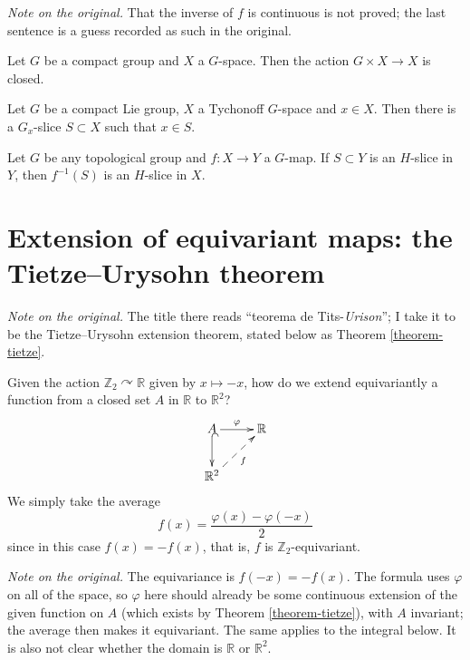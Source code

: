 \noindent
{\it Note on the original.} That the
inverse of $f$ is continuous is not
proved; the last sentence is a guess
recorded as such in the original.

\begin{lemma}
\label{lemma-compact-action-closed}
Let $G$ be a compact group and $X$ a
$G$-space. Then the action
$G\times X\to X$ is closed.
\end{lemma}

\begin{theorem}
\label{theorem-slice}
Let $G$ be a compact Lie group, $X$ a
Tychonoff $G$-space and $x\in X$. Then
there is a $G_x$-slice $S\subset X$
such that $x\in S$.
\end{theorem}

\begin{proposition}
\label{proposition-preimage-of-slice}
Let $G$ be any topological group and
$f:X\to Y$ a $G$-map. If $S\subset Y$
is an $H$-slice in $Y$, then
$f^{-1}(S)$ is an $H$-slice in $X$.
\end{proposition}

\section{Extension of equivariant maps:
the Tietze--Urysohn theorem}
\label{section-extension}

\noindent
{\it Note on the original.} The title
there reads ``teorema de
Tits-{\it Urison}''; I take it to be the
Tietze--Urysohn extension theorem,
stated below as
Theorem \ref{theorem-tietze}.

Given the action
$\mathbb{Z}_2\curvearrowright\mathbb{R}$
given by $x\mapsto-x$, how do we extend
equivariantly a function from a closed
set $A$ in $\mathbb{R}$ to
$\mathbb{R}^2$?
$$
\xymatrix{
A \ar[r]^-{\varphi}
  \ar@{^{(}->}[d]
  & \mathbb{R} \\
\mathbb{R}^2 \ar@{-->}[ur]_{f}
}
$$
We simply take the average
$$
f(x)=\frac{\varphi(x)-\varphi(-x)}{2}
$$
since in this case $f(x)=-f(x)$, that
is, $f$ is $\mathbb{Z}_2$-equivariant.

\noindent
{\it Note on the original.} The
equivariance is $f(-x)=-f(x)$. The
formula uses $\varphi$ on all of the
space, so $\varphi$ here should already
be some continuous extension of the
given function on $A$ (which exists by
Theorem \ref{theorem-tietze}), with $A$
invariant; the average then makes it
equivariant. The same applies to the
integral below. It is also not clear
whether the domain is $\mathbb{R}$ or
$\mathbb{R}^2$.

